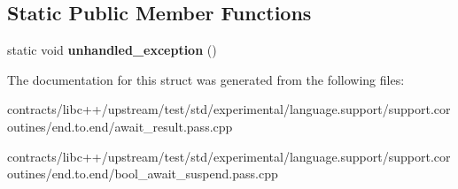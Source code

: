 \subsection*{Static Public Member Functions}
\begin{DoxyCompactItemize}
\item 
\mbox{\label{structcoro__t_1_1promise__type_a92602046201cbb8f0f93ac475eabe61a}} 
static void {\bfseries unhandled\+\_\+exception} ()
\end{DoxyCompactItemize}


The documentation for this struct was generated from the following files\+:\begin{DoxyCompactItemize}
\item 
contracts/libc++/upstream/test/std/experimental/language.\+support/support.\+coroutines/end.\+to.\+end/await\+\_\+result.\+pass.\+cpp\item 
contracts/libc++/upstream/test/std/experimental/language.\+support/support.\+coroutines/end.\+to.\+end/bool\+\_\+await\+\_\+suspend.\+pass.\+cpp\end{DoxyCompactItemize}
